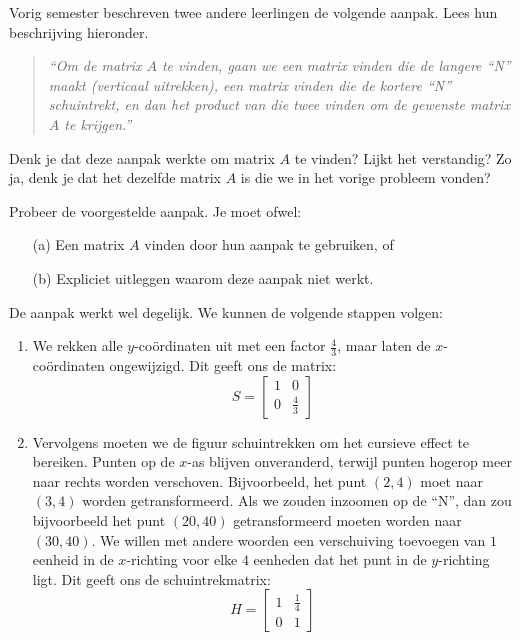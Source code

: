 \documentclass{ximera}
\begin{document}
\begin{exercise}
Vorig semester beschreven twee andere leerlingen de volgende aanpak.
Lees hun beschrijving hieronder.

\begin{quote}
\textit{``Om de matrix $A$ te vinden, gaan we een matrix vinden die de langere ``N'' maakt (verticaal uitrekken), een matrix vinden die de kortere ``N'' schuintrekt, en dan het product van die twee vinden om de gewenste matrix $A$ te krijgen.''}
\end{quote}

Denk je dat deze aanpak werkte om matrix $A$ te vinden?
Lijkt het verstandig?
Zo ja, denk je dat het dezelfde matrix $A$ is die we in het vorige probleem vonden?
\end{exercise}

\begin{exercise}
Probeer de voorgestelde aanpak. Je moet ofwel:
\begin{enumerate}
\item[(a)] Een matrix $A$ vinden door hun aanpak te gebruiken, of
\item[(b)] Expliciet uitleggen waarom deze aanpak niet werkt.
\end{enumerate}
\begin{oplossing}
    De aanpak werkt wel degelijk. We kunnen de volgende stappen volgen:
    \begin{enumerate}
        \item We rekken alle \(y\)-coördinaten uit met een factor \(\frac{4}{3}\), maar laten de \(x\)-coördinaten ongewijzigd. Dit geeft ons de matrix:
        \[S = \begin{bmatrix} 1 & 0 \\ 0 & \frac{4}{3} \end{bmatrix}\]
        \item Vervolgens moeten we de figuur schuintrekken om het cursieve effect te bereiken.
        Punten op de \(x\)-as blijven onveranderd, terwijl punten hogerop meer naar rechts worden verschoven.
        Bijvoorbeeld, het punt \((2, 4)\) moet naar \((3, 4)\) worden getransformeerd.
        Als we zouden inzoomen op de ``N'', dan zou bijvoorbeeld het punt \((20,40)\) getransformeerd moeten worden naar \((30,40)\).
        We willen met andere woorden een verschuiving toevoegen van \(1\) eenheid in de \(x\)-richting voor elke \(4\) eenheden dat het punt in de \(y\)-richting ligt.
        Dit geeft ons de schuintrekmatrix:
        \[H = \begin{bmatrix} 1 & \frac{1}{4} \\ 0 & 1 \end{bmatrix}\]

\end{enumerate}
\end{oplossing}
\end{exercise}
\end{document}

